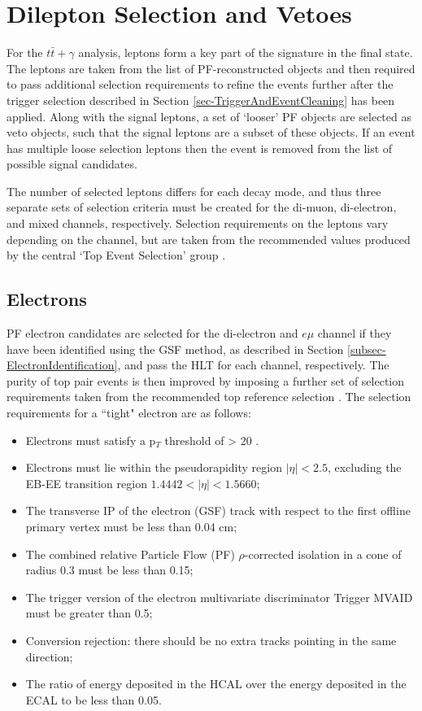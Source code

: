 
\section{Dilepton Selection and Vetoes}

For the $t\bar{t}+\gamma$ analysis, leptons form a key part of the signature in the final state. The leptons are taken from the list of PF-reconstructed objects and then required to pass additional selection requirements to refine the events further after the trigger selection described in Section \ref{sec-TriggerAndEventCleaning} has been applied. Along with the signal leptons, a set of `looser' PF objects are selected as veto objects, such that the signal leptons are a subset of these objects. If an event has multiple loose selection leptons then the event is removed from the list of possible signal candidates.

The number of selected leptons differs for each decay mode, and thus three separate sets of selection criteria must be created for the di-muon, di-electron, and mixed channels, respectively. Selection requirements on the leptons vary depending on the channel, but are taken from the recommended values produced by the central `Top Event Selection' group \cite{TopEventSelection}. 

\subsection{Electrons}

PF electron candidates are selected for the di-electron and $e\mu$ channel if they have been identified using the GSF method, as described in Section \ref{subsec-ElectronIdentification}, and pass the HLT for each channel, respectively. The purity of top pair events is then improved by imposing a further set of selection requirements taken from the recommended top reference selection \cite{TOPEGM1}. The selection requirements for a ``tight" electron are as follows:

\begin{itemize}
	\item Electrons must satisfy a p$_T$ threshold of > 20 \GeV.
	\item Electrons must lie within the pseudorapidity region $|\eta| < 2.5$, excluding the EB-EE transition region $1.4442 < |\eta| < 1.5660$;
	\item The transverse IP of the electron (GSF) track with respect to the first offline primary vertex must be less than 0.04 cm; 
	\item The combined relative Particle Flow (PF) $\rho$-corrected isolation in a cone of radius 0.3 must be less than 0.15;
	\item The trigger version of the electron multivariate discriminator Trigger MVAID must be greater than 0.5;
	\item Conversion rejection: there should be no extra tracks pointing in the same direction;
	\item The ratio of energy deposited in the HCAL over the energy deposited in the ECAL to be less than 0.05.
\end{itemize} 

